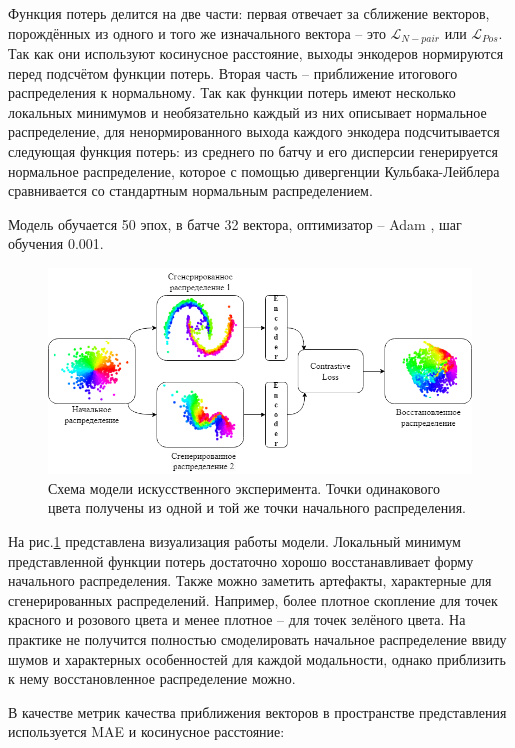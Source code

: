 \documentclass[a4paper, 14pt]{article}
\begin{document}
Функция потерь делится на две части: первая отвечает за сближение векторов, порождённых из одного и того же изначального вектора -- это $\mathcal{L}_{N-pair}$ или $\mathcal{L}_{Pos}$. Так как они используют косинусное расстояние, выходы энкодеров нормируются перед подсчётом функции потерь. Вторая часть -- приближение итогового распределения к нормальному. Так как функции потерь имеют несколько локальных минимумов и необязательно каждый из них описывает нормальное распределение, для ненормированного выхода каждого энкодера подсчитывается следующая функция потерь: из среднего по батчу и его дисперсии генерируется нормальное распределение, которое с помощью дивергенции Кульбака-Лейблера сравнивается со стандартным нормальным распределением.

Модель обучается 50 эпох, в батче 32 вектора, оптимизатор -- Adam \citep{kingma2017adam}, шаг обучения 0.001.

\begin{figure}[!ht]
    \includegraphics[scale = 0.65]{Pictures/Model.png}
    \caption{Схема модели искусственного эксперимента. Точки одинакового цвета получены из одной и той же точки начального распределения.}
    \label{fg:model}
\end{figure}

На рис.\ref{fg:model} представлена визуализация работы модели. Локальный минимум представленной функции потерь достаточно хорошо восстанавливает форму начального распределения. Также можно заметить артефакты, характерные для сгенерированных распределений. Например, более плотное скопление для точек красного и розового цвета и менее плотное -- для точек зелёного цвета. На практике не получится полностью смоделировать начальное распределение ввиду шумов и характерных особенностей для каждой модальности, однако приблизить к нему восстановленное распределение можно.

В качестве метрик качества приближения векторов в пространстве представления используется MAE и косинусное расстояние:
\end{document}
